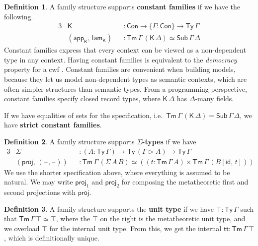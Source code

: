 \documentclass[12pt,a4paper,twoside,openany]{book}
\theoremstyle{remark}
\theoremstyle{definition}
\newtheorem{mydefinition}{Definition}
\theoremstyle{theorem}
\newcommand{\id}{\mathsf{id}}
\newcommand{\Con}{\mathsf{Con}}
\newcommand{\Sub}{\mathsf{Sub}}
\newcommand{\Tm}{\mathsf{Tm}}
\newcommand{\Ty}{\mathsf{Ty}}
\newcommand{\proj}{\mathsf{proj}}
\renewcommand{\tt}{\mathsf{tt}}
\newcommand{\blank}{\mathord{\hspace{1pt}\text{--}\hspace{1pt}}}
\newcommand{\ext}{\triangleright}
\newcommand{\lamK}{\mathsf{lam}_{\K}}
\newcommand{\appK}{\mathsf{app}_{\K}}
\newcommand{\K}{\mathsf{K}}
\begin{document}
\begin{mydefinition}
\label{def:constant-families}
A family structure supports \textbf{constant families} if we have the following.
\begin{alignat*}{3}
  & \K &&: \Con \to \{\Gamma : \Con \} \to \Ty\,\Gamma \\
  & (\appK,\,\lamK) &&: \Tm\,\Gamma\,(\K\,\Delta) \simeq \Sub\,\Gamma\,\Delta
\end{alignat*}
Constant families express that every context can be viewed as a non-dependent
type in any context. Having constant families is equivalent to the
\emph{democracy} property for a cwf
\cite{clairambault2014biequivalence,forsberg-phd}.  Constant families are
convenient when building models, because they let us model non-dependent types
as semantic contexts, which are often simpler structures than semantic types.
From a programming perspective, constant families specify closed record types,
where $\K\,\Delta$ has $\Delta$-many fields.

If we have equalities of sets for the specification,
i.e.\ $\Tm\,\Gamma\,(\K\,\Delta) = \Sub\,\Gamma\,\Delta$, we have \textbf{strict
  constant families}.

\end{mydefinition}

\begin{mydefinition}
A family structure supports \textbf{$\Sigma$-types} if we have
\begin{alignat*}{3}
  & \Sigma  &&: (A : \Ty\,\Gamma) \to \Ty\,(\Gamma\ext A) \to \Ty\,\Gamma\\
  & (\proj,\,(\blank,\blank)) &&: \Tm\,\Gamma\,(\Sigma\,A\,B) \simeq ((t : \Tm\,\Gamma\,A) \times \Tm\,\Gamma\,(B[\id,\,t]))
\end{alignat*}
We use the shorter specification above, where everything is assumed to be
natural. We may write $\proj_1$ and $\proj_2$ for composing the metatheoretic
first and second projections with $\proj$.
\end{mydefinition}

\begin{mydefinition}
A family structure supports the \textbf{unit type} if we have $\top : \Ty\,\Gamma$ such
that $\Tm\,\Gamma\,\top \simeq \top$, where the $\top$ on the right is the
metatheoretic unit type, and we overload $\top$ for the internal unit type.
From this, we get the internal $\tt : \Tm\,\Gamma\,\top$, which is
definitionally unique.
\end{mydefinition}
\end{document}
